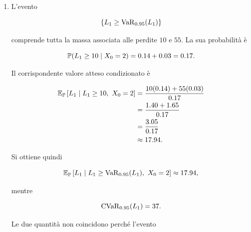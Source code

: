 \begin{enumerate}
Pertanto,

\[
\begin{split}
\E_{\Prob}
\left[
(L_1-10)^{+}
\mid X_0=2
\right]
&=
45(0.03)
\\
&=
1.35.
\end{split}
\]

Sostituendo nella formula:

\[
\begin{split}
\CVaR_{0.95}(L_1)
&=
10
+
\frac{1}{1-0.95}(1.35)
\\
&=
10+20(1.35)
\\
&=
10+27
\\
&=
37.
\end{split}
\]

Si ritrova quindi lo stesso risultato:

\[
\boxed{
\CVaR_{0.95}(L_1)=37
}.
\]

La massa parzialmente selezionata al quantile di livello $0.95$ non
compare esplicitamente nel termine

\[
\E_{\Prob}[(L_1-\eta)^{+}],
\]

poich\'{e} per $L_1=\eta=10$ la parte positiva \`{e} nulla. Il suo
effetto \`{e} incorporato nel termine iniziale $\eta$ della
rappresentazione.

\item L'evento

\[
\left\{
L_1\geq\operatorname{VaR}_{0.95}(L_1)
\right\}
\]

comprende tutta la massa associata alle perdite $10$ e $55$. La sua
probabilit\`{a} \`{e}

\[
\mathbb{P}(L_1\geq10\mid X_0=2)
=
0.14+0.03
=
0.17.
\]

Il corrispondente valore atteso condizionato \`{e}

\[
\begin{split}
\mathbb{E}_{\mathbb{P}}
\left[
L_1
\mid
L_1\geq10,\ X_0=2
\right]
&=
\frac{
10(0.14)+55(0.03)
}{
0.17
}
\\
&=
\frac{1.40+1.65}{0.17}
\\
&=
\frac{3.05}{0.17}
\\
&\approx
17.94.
\end{split}
\]

Si ottiene quindi

\[
\mathbb{E}_{\mathbb{P}}
\left[
L_1
\mid
L_1\geq\operatorname{VaR}_{0.95}(L_1),\ X_0=2
\right]
\approx
17.94,
\]

mentre

\[
\operatorname{CVaR}_{0.95}(L_1)=37.
\]

Le due quantit\`{a} non coincidono perch\'{e} l'evento


\end{enumerate}
